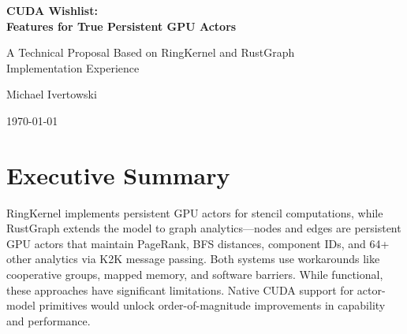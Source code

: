 \documentclass[11pt,a4paper]{article}
\begin{document}
\begin{titlepage}
    \centering
    \vspace*{2cm}

    {\Huge\bfseries CUDA Wishlist:\\[0.3cm]
    Features for True Persistent GPU Actors\par}

    \vspace{1.5cm}

    {\Large A Technical Proposal Based on RingKernel and RustGraph\\Implementation Experience\par}

    \vspace{2cm}

    {\large Michael Ivertowski\par}

    \vspace{1cm}

    {\large\today\par}

    \vfill

    \begin{abstract}
    \noindent This document outlines CUDA features that would significantly improve the implementation of persistent GPU actors. These recommendations are based on practical experience building RingKernel's persistent actor infrastructure and RustGraph's GPU-native living graph database. RingKernel implements persistent GPU actors today using workarounds like cooperative groups, mapped memory, and software barriers. RustGraph extends this model to graph analytics, where nodes and edges are persistent GPU actors that maintain analytics state (PageRank, BFS, Connected Components) via message passing across multi-layer hypergraph structures. While functional, these approaches have significant limitations. Native CUDA support for actor-model primitives would unlock order-of-magnitude improvements in capability and performance.
    \end{abstract}

\end{titlepage}

\tableofcontents
\newpage

\section{Executive Summary}

RingKernel implements persistent GPU actors for stencil computations, while RustGraph extends the model to graph analytics---nodes and edges are persistent GPU actors that maintain PageRank, BFS distances, component IDs, and 64+ other analytics via K2K message passing. Both systems use workarounds like cooperative groups, mapped memory, and software barriers. While functional, these approaches have significant limitations. Native CUDA support for actor-model primitives would unlock order-of-magnitude improvements in capability and performance.
\end{document}
